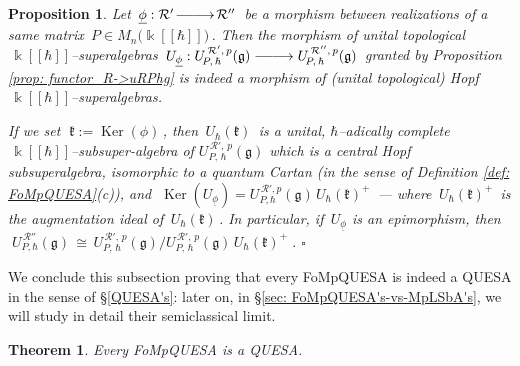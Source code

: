 \documentclass[12pt,reqno,twoside,a4paper]{amsart}
\numberwithin{equation}{section}
\newtheorem{theorem}[lema]{Theorem}
\newtheorem{prop}[lema]{Proposition}
\theoremstyle{definition}
\newtheorem{free text}[lema]{}
\theoremstyle{remark}
\newcommand \Ker{\operatorname{Ker}}
\newcommand{\R}{{\mathcal R}}
\def \kh{{\Bbbk[[\hbar]]}}
\def \lieg{\mathfrak{g}}
\def \liek{\mathfrak{k}}
\theoremstyle{plain}
\begin{document}
\begin{prop}  \label{prop: central-Hopf-extens_FoMpQUEAs}
%
 Let  $ \, \underline{\phi} : \R' \!\relbar\joinrel\relbar\joinrel\longrightarrow\! \R'' \, $
 be a morphism between realizations of a same matrix  $ \, P \in M_n\big( \kh \big) \, $.
 Then the morphism of unital topological  $ \, \kh $--superalgebras
 $ \, U_{\underline{\phi}} : U^{\,\R',\,p}_{\!P,\,\hbar}(\lieg) \relbar\joinrel\relbar\joinrel\longrightarrow U^{\,\R'',\,p}_{\!P,\,\hbar}(\lieg) \, $
 granted by  Proposition \ref{prop: functor_R->uRPhg}  is indeed a morphism of (unital topological)  \textsl{Hopf}  $ \, \kh $--superalgebras.
                                                                          \par
   If we set  $ \; \liek := \Ker(\phi) \, $, then  $ \, U_\hbar(\liek) \, $  is a unital,  $ \hbar $--adically  complete  $ \, \kh $--subsuper-\break{}algebra  of  $ U^{\,\R',\,p}_{\!P,\,\hbar}(\lieg) $  which is a central Hopf subsuperalgebra, isomorphic to a quantum Cartan (in the sense of  Definition \ref{def: FoMpQUESA}\textit{(c)\/}),  and  $ \; \Ker(U_{\underline{\phi}}) = U^{\,\R',p}_{\!P,\hbar}(\lieg) \, {U_\hbar(\liek)}^+ \, $   --- where  $ \, {U_\hbar(\liek)}^+ \, $  is the augmentation ideal of  $ \, U_\hbar(\liek) \, $.  In particular, if  $ \, U_{\underline{\phi}} $  is an  \textsl{epi}morphism,  then  $ \; U^{\,\R''}_{\!P,\hbar}(\lieg) \, \cong \, U^{\,\R',\,p}_{\!P,\,\hbar}(\lieg) \Big/ U^{\,\R',\,p}_{\!P,\,\hbar}(\lieg) \, {U_\hbar(\liek)}^+ \; $.   \hfill  $ \square $
%
\end{prop}

\vskip9pt

   We conclude this subsection proving that every FoMpQUESA is indeed a QUESA in the sense of  \S \ref{QUESA's}:  later on, in  \S \ref{sec: FoMpQUESA's-vs-MpLSbA's},  we will study in detail their semiclassical limit.

\vskip13pt

\begin{theorem}  \label{thm: FoMpQUESAs-are-QUESAs}
%
 Every FoMpQUESA is a QUESA.
%
\end{theorem}
\end{document}
